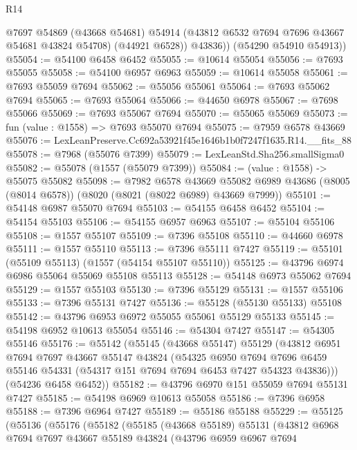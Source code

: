 \begin{lexlean}{R14}
\begin{coremodule}
            @7697
            @54869
            (@43668 @54681)
            @54914
            (@43812 @6532 @7694 @7696 @43667 @54681 @43824 @54708)
            (@44921 @6528))
          @43836))
      (@54290 @54910 @54913))
@55054 := @54100 @6458 @6452
@55055 := @10614 @55054
@55056 := @7693 @55055
@55058 := @54100 @6957 @6963
@55059 := @10614 @55058
@55061 := @7693 @55059 @7694
@55062 := @55056 @55061
@55064 := @7693 @55062 @7694
@55065 := @7693 @55064
@55066 := @44650 @6978
@55067 := @7698 @55066
@55069 := @7693 @55067 @7694
@55070 := @55065 @55069
@55073 := fun (value : @1558) => @7693 @55070 @7694
@55075 := @7959 @6578 @43669
@55076 := LexLeanPreserve.Cc692a53921f45e1646b1b0f7247f1635.R14.__fits_88
@55078 := @7968 (@55076 @7399)
@55079 := LexLeanStd.Sha256.smallSigma0
@55082 := @55078 (@1557 (@55079 @7399))
@55084 := (value : @1558) -> @55075 @55082
@55098 := @7982
    @6578
    @43669
    @55082
    @6989
    @43686
    (@8005 (@8014 @6578))
    (@8020 (@8021 (@8022 @6989) @43669 @7999))
@55101 := @54148 @6987 @55070 @7694
@55103 := @54155 @6458 @6452
@55104 := @54154 @55103
@55106 := @54155 @6957 @6963
@55107 := @55104 @55106
@55108 := @1557 @55107
@55109 := @7396 @55108
@55110 := @44660 @6978
@55111 := @1557 @55110
@55113 := @7396 @55111 @7427
@55119 := @55101 (@55109 @55113) (@1557 (@54154 @55107 @55110))
@55125 := @43796 @6974 @6986 @55064 @55069 @55108 @55113
@55128 := @54148 @6973 @55062 @7694
@55129 := @1557 @55103
@55130 := @7396 @55129
@55131 := @1557 @55106
@55133 := @7396 @55131 @7427
@55136 := @55128 (@55130 @55133) @55108
@55142 := @43796 @6953 @6972 @55055 @55061 @55129 @55133
@55145 := @54198 @6952 @10613 @55054
@55146 := @54304 @7427
@55147 := @54305 @55146
@55176 := @55142
    (@55145
      (@43668 @55147)
      @55129
      (@43812
        @6951
        @7694
        @7697
        @43667
        @55147
        @43824
        (@54325
          @6950
          @7694
          @7696
          @6459
          @55146
          @54331
          (@54317 @151 @7694 @7694 @6453 @7427 @54323 @43836)))
      (@54236 @6458 @6452))
@55182 := @43796 @6970 @151 @55059 @7694 @55131 @7427
@55185 := @54198 @6969 @10613 @55058
@55186 := @7396 @6958
@55188 := @7396 @6964 @7427
@55189 := @55186 @55188
@55229 := @55125
    (@55136
      (@55176
        (@55182
          (@55185
            (@43668 @55189)
            @55131
            (@43812
              @6968
              @7694
              @7697
              @43667
              @55189
              @43824
              (@43796
                @6959
                @6967
                @7694

\end{coremodule}
\end{lexlean}
